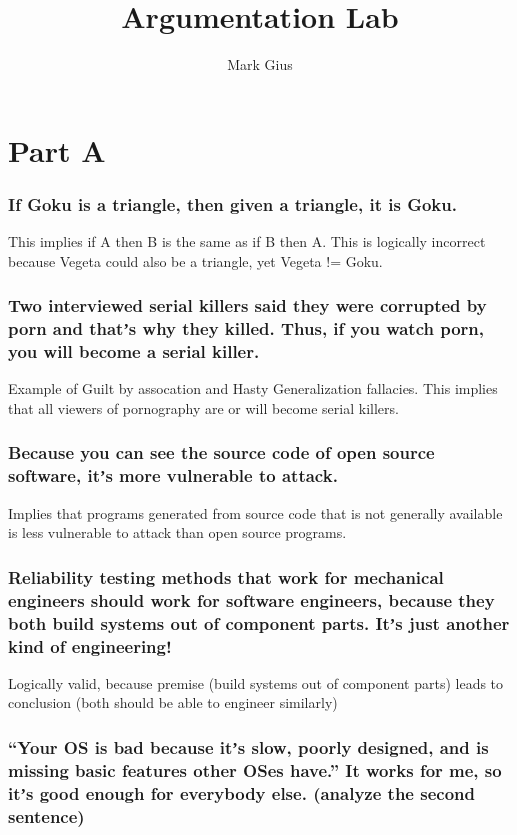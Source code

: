 \documentclass[11pt]{article}
\begin{document}
\author{Mark Gius}
\title{Argumentation Lab}
\maketitle
\newpage

\part*{Part A}

\section{If Goku is a triangle, then given a triangle, it is Goku.}

This implies if A then B is the same as if B then A. This is logically
incorrect because Vegeta could also be a triangle, yet Vegeta != Goku.

\section{Two interviewed serial killers said they were corrupted by porn and
   thatʼs why they killed. Thus, if you watch porn, you will become a serial
   killer.}
Example of Guilt by assocation and Hasty Generalization fallacies.  This
implies that all viewers of pornography are or will become serial killers.

\section{Because you can see the source code of open source software, itʼs more
   vulnerable to attack.} 
   
Implies that programs generated from source code that
is not generally available is less vulnerable to attack than open source
programs. 

\section{Reliability testing methods that work for mechanical engineers should
   work for software engineers, because they both build systems out of
   component parts.  Itʼs just another kind of engineering!}
Logically valid, because premise (build systems out of component parts) 
leads to conclusion (both should be able to engineer similarly)

\section{“Your OS is bad because itʼs slow, poorly designed, and is missing
   basic features other OSes have.” It works for me, so itʼs good enough for
   everybody else. (analyze the second sentence)}
\end{document}
